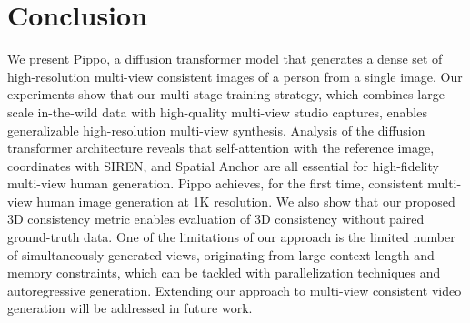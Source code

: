 




\section{Conclusion}
We present Pippo, a diffusion transformer model that generates a dense set of high-resolution 
multi-view consistent images of a person from a single image. 
Our experiments show that our multi-stage training strategy, which combines large-scale 
in-the-wild data with high-quality multi-view studio captures, enables generalizable 
high-resolution multi-view synthesis.
Analysis of the diffusion transformer architecture reveals that self-attention with the reference image, 
\plucker coordinates with SIREN, and Spatial Anchor are all essential for high-fidelity multi-view human 
generation.
Pippo achieves, for the first time, consistent multi-view human image generation at 1K resolution. 
We also show that our proposed 3D consistency metric enables evaluation of 3D consistency without 
paired ground-truth data. 
One of the limitations of our approach is the limited number of simultaneously generated views, 
originating from large context length and memory constraints, which can be tackled with parallelization 
techniques and autoregressive generation.
Extending our approach to multi-view consistent video generation will be addressed in future work.







































